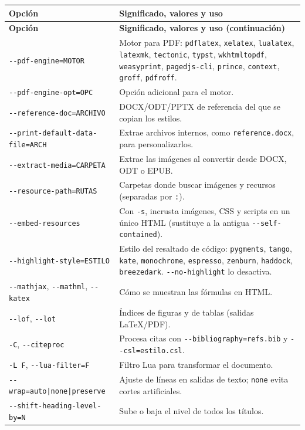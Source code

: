 \documentclass[11pt,a4paper]{article}
\newenvironment{opciones}[1][Opción]{%
	\par\begingroup\small
	\begin{longtable}{L{4.25cm}L{11.2cm}}
		\toprule\rowcolor{tablacab}\cab{#1} & \cab{Significado, valores y uso} \\ \midrule
		\endfirsthead
		\toprule\rowcolor{tablacab}\cab{#1} & \cab{Significado, valores y uso (continuación)} \\ \midrule
		\endhead
		\bottomrule
		\endfoot}
	{\end{longtable}\endgroup}
\newcommand{\opt}[1]{\texttt{\textcolor{colopt}{#1}}}      %
\newcommand{\val}[1]{\texttt{#1}}                          %
\newcommand{\cab}[1]{\textbf{#1}}
\begin{document}
\begin{opciones}
		\opt{-{}-pdf-\allowbreak{}engine=\allowbreak{}MOTOR} & Motor para PDF: \val{pdflatex}, \val{xelatex}, \val{lualatex}, \val{latexmk}, \val{tectonic}, \val{typst}, \val{wkhtmltopdf}, \val{weasyprint}, \val{pagedjs-cli}, \val{prince}, \val{context}, \val{groff}, \val{pdfroff}.\\
		\opt{-{}-pdf-\allowbreak{}engine-\allowbreak{}opt=\allowbreak{}OPC} & Opción adicional para el motor.\\
		\opt{-{}-reference-\allowbreak{}doc=\allowbreak{}ARCHIVO} & DOCX/ODT/PPTX de referencia del que se copian los estilos.\\
		\opt{-{}-print-\allowbreak{}default-\allowbreak{}data-\allowbreak{}file=\allowbreak{}ARCH} & Extrae archivos internos, como \val{reference.docx}, para personalizarlos.\\
		\opt{-{}-extract-\allowbreak{}media=\allowbreak{}CARPETA} & Extrae las imágenes al convertir desde DOCX, ODT o EPUB.\\
		\opt{-{}-resource-\allowbreak{}path=\allowbreak{}RUTAS} & Carpetas donde buscar imágenes y recursos (separadas por \val{:}).\\
		\opt{-{}-embed-\allowbreak{}resources} & Con \opt{-s}, incrusta imágenes, CSS y scripts en un único HTML (sustituye a la antigua \opt{-{}-self-\allowbreak{}contained}).\\
		\opt{-{}-highlight-\allowbreak{}style=\allowbreak{}ESTILO} & Estilo del resaltado de código: \val{pygments}, \val{tango}, \val{kate}, \val{monochrome}, \val{espresso}, \val{zenburn}, \val{haddock}, \val{breezedark}. \opt{-{}-no-highlight} lo desactiva.\\
		\opt{-{}-mathjax}, \opt{-{}-mathml}, \opt{-{}-katex} & Cómo se muestran las fórmulas en HTML.\\
		\opt{-{}-lof}, \opt{-{}-lot} & Índices de figuras y de tablas (salidas LaTeX/PDF).\\
		\opt{-C}, \opt{-{}-citeproc} & Procesa citas con \opt{-{}-bibliography=\allowbreak{}refs.bib} y \opt{-{}-csl=\allowbreak{}estilo.csl}.\\
		\opt{-L F}, \opt{-{}-lua-filter=F} & Filtro Lua para transformar el documento.\\
		\opt{-{}-wrap=\allowbreak{}auto|\allowbreak{}none|\allowbreak{}preserve} & Ajuste de líneas en salidas de texto; \val{none} evita cortes artificiales.\\
		\opt{-{}-shift-\allowbreak{}heading-\allowbreak{}level-\allowbreak{}by=\allowbreak{}N} & Sube o baja el nivel de todos los títulos.\\

\end{opciones}
\end{document}
